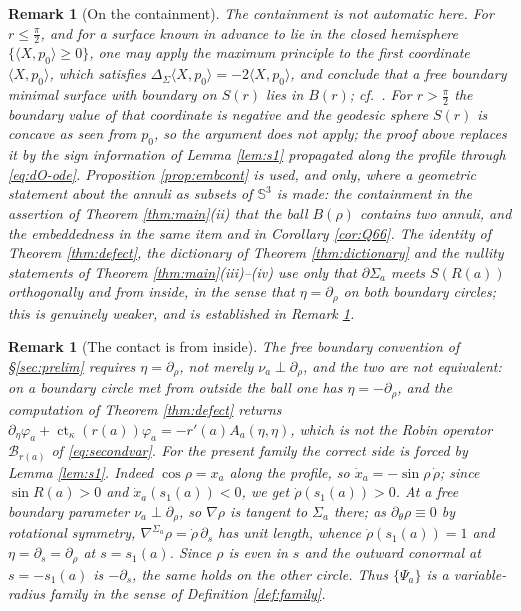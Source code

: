 \documentclass[10pt,a4paper]{amsart}
\newtheorem{remark}[theorem]{Remark}
\newcommand{\Sph}{\mathbb{S}}
\newcommand{\ct}{\operatorname{ct}_\kappa}
\begin{document}
\begin{remark}[On the containment]\label{rem:constrained}
The containment is not automatic here. For $r\leq\tfrac\pi2$, and for a surface known in advance to lie in the closed
hemisphere $\{\langle X,p_0\rangle\geq 0\}$, one may apply the maximum principle to the first coordinate $\langle X,p_0\rangle$, which satisfies $\Delta_{\Sigma}\langle X,p_0\rangle=-2\langle X,p_0\rangle$, and conclude that
a free boundary minimal surface with boundary on $S(r)$ lies in $B(r)$; cf.\ \cite[Rem. 2.3]{NZ1}. For $r>\tfrac\pi2$ the boundary value of that coordinate is negative and the geodesic sphere $S(r)$ is concave as seen from $p_0$, so the argument does not apply; the proof above replaces it by the sign information of Lemma \ref{lem:s1} propagated along the profile through \eqref{eq:dO-ode}. Proposition \ref{prop:embcont} is used, and only, where a geometric statement about the annuli as subsets of $\Sph^3$ is made: the containment in the assertion of Theorem \ref{thm:main}(ii) that the ball $B(\rho)$ \emph{contains} two annuli, and the embeddedness in the same item and in Corollary \ref{cor:Q66}. The identity of Theorem \ref{thm:defect}, the dictionary of Theorem \ref{thm:dictionary} and the nullity statements of Theorem \ref{thm:main}(iii)--(iv) use only that $\partial\Sigma_a$ meets $S(R(a))$ orthogonally \emph{and from inside}, in the sense that $\eta=\partial_\rho$ on both boundary circles; this is genuinely weaker, and is established in Remark \ref{rem:side}.
\end{remark}

\begin{remark}[The contact is from inside]\label{rem:side}
The free boundary convention of \S\ref{sec:prelim} requires $\eta=\partial_\rho$, not merely $\nu_a\perp\partial_\rho$, and the two are not equivalent: on a boundary circle met from outside the ball one has $\eta=-\partial_\rho$, and the computation of Theorem \ref{thm:defect} returns $\partial_\eta\varphi_a+\ct(r(a))\varphi_a=-r'(a)A_a(\eta,\eta)$, which is not the Robin operator $\mathcal{B}_{r(a)}$ of \eqref{eq:secondvar}. For the present family the correct side is forced by Lemma \ref{lem:s1}. Indeed $\cos\rho=x_a$ along the profile, so $\dot x_a=-\sin\rho\,\dot\rho$; since $\sin R(a)>0$ and $\dot x_a(s_1(a))<0$, we get $\dot\rho(s_1(a))>0$. At a free boundary parameter $\nu_a\perp\partial_\rho$, so $\nabla\rho$ is tangent to $\Sigma_a$ there; as $\partial_\theta\rho\equiv 0$ by rotational symmetry, $\nabla^{\Sigma_a}\rho=\dot\rho\,\partial_s$ has unit length, whence $\dot\rho(s_1(a))=1$ and $\eta=\partial_s=\partial_\rho$ at $s=s_1(a)$. Since $\rho$ is even in $s$ and the outward conormal at $s=-s_1(a)$ is $-\partial_s$, the same holds on the other circle. Thus $\{\Psi_a\}$ is a variable-radius family in the sense of Definition \ref{def:family}.
\end{remark}
\end{document}
